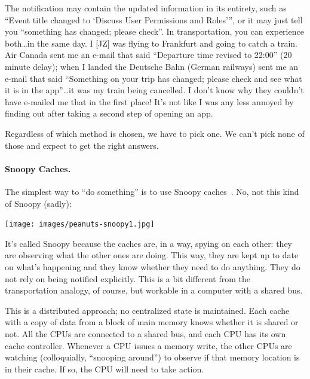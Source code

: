 \documentclass[a4paper]{report}
\begin{document}
The notification may contain the updated information in its entirety, such as ``Event title changed to `Discuss User Permissions and Roles''', or it may just tell you ``something has changed; please check''. In transportation, you can experience both\ldots in the same day. I [JZ] was flying to Frankfurt and going to catch a train. Air Canada sent me an e-mail that said ``Departure time revised to 22:00'' (20 minute delay); when I landed the Deutsche Bahn (German railways) sent me an e-mail that said ``Something on your trip has changed; please check and see what it is in the app''\ldots it was my train being cancelled. I don't know why they couldn't have e-mailed me that in the first place! It's not like I was any less annoyed by finding out after taking a second step of opening an app.

Regardless of which method is chosen, we have to pick one. We can't pick none of those and expect to get the right answers.


\paragraph{Snoopy Caches.} The simplest way to ``do something''
is to use Snoopy caches~\cite{snoopycache}. No, not this kind of Snoopy (sadly):

\begin{center}
	\texttt{[image: images/peanuts-snoopy1.jpg]}
\end{center}

It's called Snoopy because the caches are, in a way, spying on each other: they are observing what the other ones are doing. This way, they are kept up to date on what's happening and they know whether they need to do anything. They do not rely on being notified explicitly. This is a bit different from the transportation analogy, of course, but workable in a computer with a shared bus.

This is a distributed approach; no centralized state is maintained. Each cache with a copy of data from a block of main memory knows whether it is shared or not. All the CPUs are connected to a shared bus, and each CPU has its own cache controller. Whenever a CPU issues a memory write, the other CPUs are watching (colloquially, ``snooping around'') to observe if that memory location is in their cache. If so, the CPU will need to take action.
\end{document}
